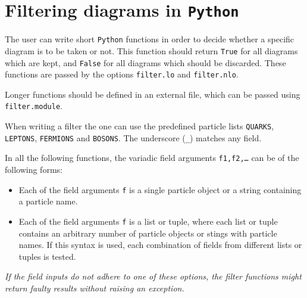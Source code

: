 \documentclass[11pt,a4paper]{refrep}
\newcommand{\python}{{\tt Python}\xspace}
\begin{document}

\section{Filtering diagrams in \python{}}
\label{sec:filter}
The user can write short \python{} functions in order to decide whether
a specific diagram is to be taken or not. This function should return
\texttt{True} for all diagrams which are kept, and \texttt{False} for
all diagrams which should be discarded. These functions are passed by
the options \texttt{filter.lo} and \texttt{filter.nlo}.

Longer functions should be defined in an external file, which can be
passed using \texttt{filter.module}.

When writing a filter the one can use the predefined particle lists
\texttt{QUARKS}, \texttt{LEPTONS}, \texttt{FERMIONS} and \texttt{BOSONS}.
The underscore (\texttt{\_}) matches any field.

In all the following functions, the variadic field arguments {\tt f1,f2,\ldots} can be of the following 
forms:
\begin{itemize}
   \item Each of the field arguments {\tt f} is a single particle object or a string containing a particle 
   name.
   \item Each of the field arguments {\tt f} is a list or tuple, where each list or tuple contains an arbitrary 
   number of particle objects or stings with particle names. If this syntax is used, each combination of fields
   from different lists or tuples is tested.
\end{itemize}
\emph{If the field inputs do not adhere to one of these options, the filter functions might return faulty results
without raising an exception.}
\end{document}

